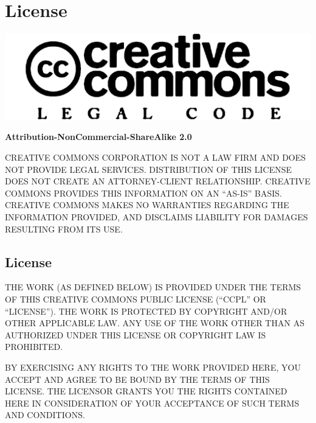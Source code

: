 \chapter*{License}%
%

\begin{center}
\includegraphics{logo_code}

\bigskip

\textbf{Attribution-NonCommercial-ShareAlike 2.0}
\end{center}

\begin{framed}
CREATIVE COMMONS CORPORATION IS NOT A LAW FIRM AND DOES NOT PROVIDE LEGAL SERVICES. DISTRIBUTION OF THIS LICENSE DOES NOT CREATE AN ATTORNEY-CLIENT RELATIONSHIP. CREATIVE COMMONS PROVIDES THIS INFORMATION ON AN ``AS-IS'' BASIS. CREATIVE COMMONS MAKES NO WARRANTIES REGARDING THE INFORMATION PROVIDED, AND DISCLAIMS LIABILITY FOR DAMAGES RESULTING FROM ITS USE.
\end{framed}

\section{License}

{\sloppy
THE WORK (AS DEFINED BELOW) IS PROVIDED UNDER THE TERMS OF THIS
CREATIVE COMMONS PUBLIC LICENSE (``CCPL'' OR ``LICENSE''). THE WORK IS
PROTECTED BY COPYRIGHT AND/OR OTHER APPLICABLE LAW. ANY USE OF THE
WORK OTHER THAN AS AUTHORIZED UNDER THIS LICENSE OR COPYRIGHT LAW IS
PROHIBITED.

BY EXERCISING ANY RIGHTS TO THE WORK PROVIDED HERE, YOU ACCEPT AND
AGREE TO BE BOUND BY THE TERMS OF THIS LICENSE. THE LICENSOR GRANTS
YOU THE RIGHTS CONTAINED HERE IN CONSIDERATION OF YOUR ACCEPTANCE OF
SUCH TERMS AND CONDITIONS.}

